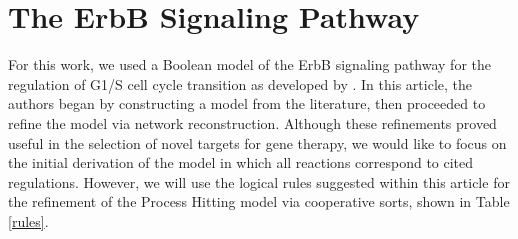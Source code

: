 \documentclass{article}
\begin{document}



\appendix
\section{The ErbB Signaling Pathway}
For this work, we used a Boolean model of the ErbB signaling pathway for the regulation of G1/S cell cycle transition as developed by \cite{Sahin09}. In this article, the authors began by constructing a model from the literature, then proceeded to refine the model via network reconstruction. Although these refinements proved useful in the selection of novel targets for gene therapy, we would like to focus on the initial derivation of the model in which all reactions correspond to cited regulations. However, we will use the logical rules suggested within this article for the refinement of the Process Hitting model via cooperative sorts, shown in Table \ref{rules}.\\
\end{document}
